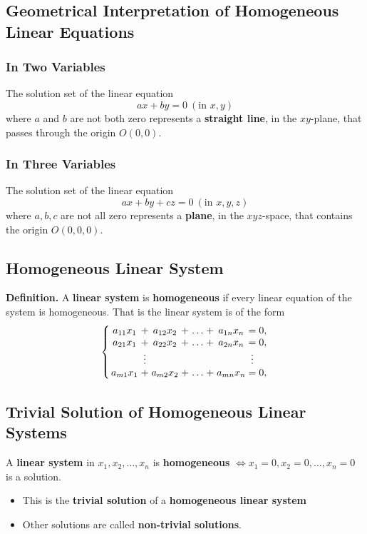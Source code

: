 \documentclass[../ma2001_notes.tex]{subfiles}
\begin{document}
\subsection{Geometrical Interpretation of Homogeneous Linear Equations}
\subsubsection{In Two Variables}
The solution set of the linear equation
\[ax+by=0\ (\text{in }x,y)\]
where \(a\) and \(b\) are not both zero represents a \textbf{straight line}, in the \(xy\)-plane, that passes through the origin \(O(0,0)\).

\subsubsection{In Three Variables}
The solution set of the linear equation
\[ax+by+cz=0\ (\text{in }x,y,z)\]
where \(a,b,c\) are not all zero represents a \textbf{plane}, in the \(xyz\)-space, that contains the origin \(O(0,0,0)\).

\subsection{Homogeneous Linear System}
\textbf{Definition.} A \textbf{linear system} is \textbf{homogeneous} if every linear equation of the system is homogeneous. That is the linear system is of the form
\[\left\{
\arraycolsep=1.4pt
\begin{array}{ccccccccc}
	a_{11}x_1 & + & a_{12}x_2 & + & \ldots & + & a_{1n}x_n & = & 0, \\
	a_{21}x_1 & + & a_{22}x_2 & + & \ldots & + & a_{2n}x_n & = & 0, \\
	& \vdots & & & & & & \vdots & \\
	a_{m1}x_1 & + & a_{m2}x_2 & + & \ldots & + & a_{mn}x_n & = & 0,
\end{array}\right.\]

\subsection{Trivial Solution of Homogeneous Linear Systems}
A \textbf{linear system} in \(x_1,x_2,\ldots,x_n\) is \textbf{homogeneous} \(\iff x_1=0,x_2=0,\ldots,x_n=0\) is a solution.
\begin{itemize}
	\item This is the \textbf{trivial solution} of a \textbf{homogeneous linear system}
	\item Other solutions are called \textbf{non-trivial solutions}.
\end{itemize}
\end{document}
